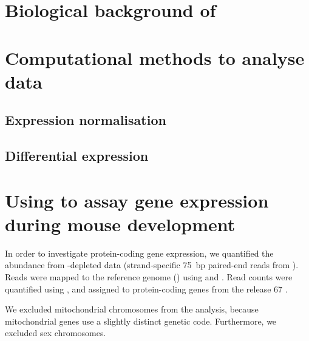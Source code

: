 \subsection{}

\section{Biological background of }

\section{Computational methods to analyse  data}

\subsection{Expression normalisation}

\subsection{Differential expression}

\section{Using  to assay gene expression during mouse development}

In order to investigate protein-coding gene expression, we quantified the \mrna
abundance from \rrna-depleted \rnaseq data (strand-specific \SI{75}{bp}
paired-end reads from  ). Reads were mapped to
the \mmu reference genome () using 
\citep{Fonseca:2014} and  \citep{Kim:2013}. Read counts were
quantified using  \citep{Anders:2014}, and assigned to
protein-coding genes from the  release \num{67}
\citep{Flicek:2014}.

We excluded mitochondrial chromosomes from the analysis, because mitochondrial
genes use a slightly distinct genetic code. Furthermore, we excluded
sex chromosomes.
